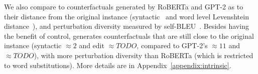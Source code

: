 We also compare \sysname to counterfactuals generated by RoBERTa and GPT-2 as to their distance from the original instance (syntactic~\cite{zhang1989simple} and word level Levenshtein distance~\cite{levenshtein1966binary}), and perturbation diversity measured by self-BLEU~\cite{zhu2018texygen}. 
Besides having the benefit of control, \sysname generates counterfactuals that are still close to the original instance (syntactic $\approx 2$ and edit $\approx TODO$, compared to GPT-2's $\approx 11$ and $\approx TODO$), with more perturbation diversity than RoBERTa (which is restricted to word substitutions).
More details are in Appendix~\ref{appendix:intrinsic}.





